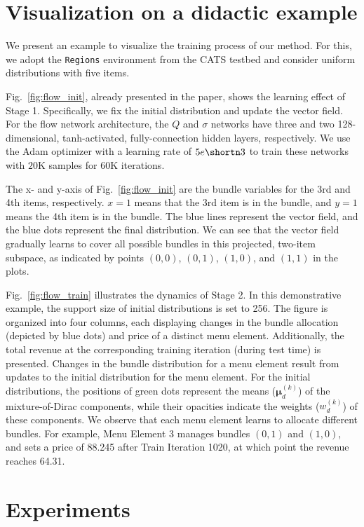 \section{Visualization on a didactic example}\label{sec:viz}

We present an example to visualize the training process of our method. For this, we adopt the \texttt{Regions} environment from the CATS testbed and consider uniform distributions with five items. 

Fig.~\ref{fig:flow_init}, already presented in the paper, shows the learning effect of Stage 1. Specifically, we fix the initial distribution and update the vector field. For the flow network architecture, the $Q$ and $\sigma$ networks have three and two 128-dimensional, tanh-activated, fully-connection hidden layers, respectively. We use the Adam optimizer with a learning rate of $5e\shortn 3$ to train these networks with $20$K samples for $60$K iterations.

The x- and y-axis of Fig.~\ref{fig:flow_init} are the bundle variables for the 3rd and 4th items, respectively. $x=1$ means that the 3rd item is in the bundle, and $y=1$ means the 4th item is in the bundle. The blue lines represent the vector field, and the blue dots represent the final distribution. We can see that the vector field gradually learns to cover all possible bundles in this projected, two-item subspace, 
as indicated by points $(0,0)$, $(0,1)$, $(1,0)$, and $(1,1)$ in the plots.

Fig.~\ref{fig:flow_train} illustrates the dynamics of Stage 2. In this demonstrative example, the support size of initial distributions is set to 256. The figure is organized into four columns, each displaying changes in the bundle allocation (depicted by blue dots) and  price of a distinct menu element. Additionally, the total revenue at the corresponding training iteration (during test time) is  presented. Changes in the bundle distribution for a menu element result from updates to the initial distribution for the menu element. For the initial distributions, the positions of green dots represent the means ($\bm\mu_d^{(k)}$) of the mixture-of-Dirac components, while their opacities indicate the weights ($w_d^{(k)}$) of these components. We observe that each menu element learns to allocate different bundles. For example, Menu Element 3 manages bundles $(0,1)$ and $(1,0)$, and sets a price of 88.245 after Train Iteration 1020, at which point the revenue reaches 64.31.

\section{Experiments}

